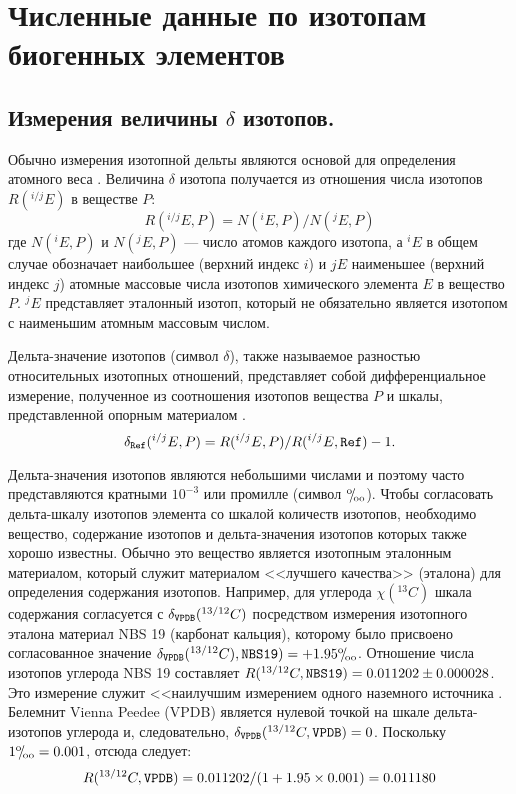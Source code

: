 \documentclass[a5paper,openany]{book}
\newcommand{\permil}{\ensuremath{{}^\text{o}\mkern-5mu/\mkern-3mu_\text{oo}}}
\begin{document}
\chapter{Численные данные по изотопам биогенных элементов} \label{IsotopeData}

\section{Измерения величины $\delta$ изотопов.} \label{DeltaIsotopes}

Обычно измерения изотопной дельты являются основой для определения атомного веса  \cite{IUPACMS2020}.
Величина $\delta$ изотопа получается из отношения числа изотопов $R(^{i/j}E)$ в веществе $P$:
\begin{equation} \label{REP}
R(^{i/j}E, P) = N(^iE, P)/N(^jE, P) %
\end{equation}
где $N(^iE, P)$ и $N(^jE, P)$ — число атомов каждого изотопа, а $^iE$ в общем случае обозначает наибольшее
(верхний индекс $i$) и $jE$ наименьшее (верхний индекс $j$) атомные массовые числа изотопов химического элемента $E$ в вещество $P$. $^jE$ представляет эталонный изотоп, который не обязательно является изотопом с наименьшим атомным массовым числом. 

Дельта-значение изотопов (символ $\delta$), также называемое разностью относительных изотопных отношений, представляет собой дифференциальное измерение, полученное из соотношения изотопов вещества $P$ и шкалы, представленной опорным материалом \cite{IUPAC2014}.  
\begin{equation} \label{DeltaIsotopesDef} %
\delta_{\tt Ref}(^{i/j}E, P)  = R(^{i/j}E, P)/R(^{i/j}E, {\tt Ref}) - 1.
\end{equation}

Дельта-значения изотопов являются небольшими числами и поэтому часто представляются кратными $10^{-3}$ или промилле (символ $\permil$). \index{промилле, $\permil$}
Чтобы согласовать дельта-шкалу изотопов элемента со шкалой количеств изотопов, необходимо вещество,
содержание изотопов и дельта-значения изотопов которых также хорошо известны.
Обычно это вещество является изотопным эталонным материалом, который служит материалом <<лучшего качества>> (эталона) для определения содержания изотопов. Например, для углерода $\chi(^{13}C)$
шкала содержания согласуется с  $\delta_{\tt VPDB}(^{13/12}C)$ посредством измерения изотопного эталона
материал NBS 19 (карбонат кальция), которому было присвоено согласованное значение $\delta_{\tt VPDB}(^{13/12}C), {\tt NBS 19}) = +1.95 \permil$. 
Отношение числа изотопов углерода NBS 19 составляет
$R(^{13/12}C, {\tt NBS 19}) = 0.011 202 \pm 0.000 028$. 
Это измерение служит <<наилучшим измерением одного наземного источника \cite{IUPAC2016}. Белемнит Vienna Peedee (VPDB) является нулевой точкой на шкале дельта-изотопов углерода и, следовательно,
$  \delta_{\tt VPDB}(^{13/12}C, {\tt VPDB}) = 0$. Поскольку $1 \permil = 0.001$, отсюда следует: 
\begin{equation} %
R(^{13/12}C, {\tt VPDB}) = 0.011 202/(1 + 1.95 \times 0.001) = 0.011 180
\end{equation}
\end{document}
